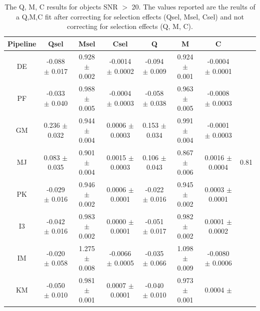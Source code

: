 \begin{table}
        \centering
        \begin{tabular}{|c|c|c|c|c|c|c|c|}  
          \hline
          Pipeline & Qsel  & Msel  & Csel  & Q  & M  & C  \\
          \hline
          DE & -0.088 $\pm$ 0.017 & 0.928 $\pm$ 0.002 & -0.0014 $\pm$ 0.0002 & -0.094 $\pm$ 0.009 & 0.924 $\pm$ 0.001 & -0.0004 $\pm$ 0.0001 \\
          \hline
          PF & -0.033 $\pm$ 0.040 & 0.988 $\pm$ 0.005 & -0.0004
          $\pm$ 0.0003 & -0.058 $\pm$ 0.038 & 0.963 $\pm$ 0.005 &
          -0.0008 $\pm$ 0.0003 \\
          \hline
          GM & 0.236 $\pm$ 0.032 & 0.944 $\pm$ 0.004 & 0.0006
          $\pm$ 0.0003 & 0.153 $\pm$ 0.034 & 0.991 $\pm$ 0.004 &
          -0.0001 $\pm$ 0.0003  \\
          \hline
          MJ & 0.083 $\pm$ 0.035 & 0.901 $\pm$ 0.004 & 0.0015 $\pm$
          0.0003 & 0.106 $\pm$ 0.043 & 0.867 $\pm$ 0.006 & 0.0016
          $\pm$ 0.0004 & 0.81 \\
          \hline
          PK & -0.029 $\pm$ 0.016 & 0.946 $\pm$ 0.002 & 0.0006 $\pm$
          0.0001 & -0.022 $\pm$ 0.016 & 0.945 $\pm$ 0.002 & 0.0003
          $\pm$ 0.0001 \\
          \hline
          I3 & -0.042 $\pm$ 0.016 & 0.983 $\pm$ 0.002 & 0.0000
          $\pm$ 0.0001 & -0.051 $\pm$ 0.017 & 0.982 $\pm$ 0.002 &
          0.0001 $\pm$ 0.0002 \\
          \hline
          IM & -0.020 $\pm$ 0.058 & 1.275 $\pm$ 0.008 & -0.0066
          $\pm$ 0.0005 & -0.035 $\pm$ 0.066 & 1.098 $\pm$ 0.009 &
          -0.0080 $\pm$ 0.0006 \\
          \hline
          KM & -0.050 $\pm$ 0.010 & 0.981 $\pm$ 0.001 & 0.0007 $\pm$
          0.0001 & -0.040 $\pm$ 0.010 & 0.973 $\pm$ 0.001 & 0.0004
          $\pm$ \\
          \hline
        \end{tabular}
        \caption{ The Q, M, C results for objects SNR $>$ 20. The
          values reported are the reults of a Q,M,C fit after
          correcting for selection effects (Qsel, Msel, Csel) and not
          correcting for selection effects (Q, M, C).}
    \label{table:QMC_sel}
\end{table}

